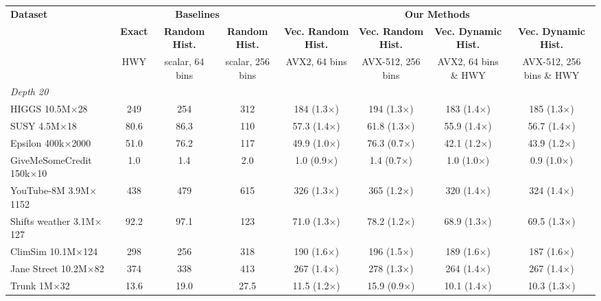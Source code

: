 \begin{table}[p]
    \centering
    \ContinuedFloat
    \footnotesize
    \setlength{\tabcolsep}{2.5pt}
    \begin{tabular}{l|ccc|cccc}
        \hline
        \multirow{3}{*}{\textbf{Dataset}} & \multicolumn{3}{c|}{\textbf{Baselines}} & \multicolumn{4}{c}{\textbf{Our Methods}} \\
         & \textbf{Exact} & \textbf{Random Hist.} & \textbf{Random Hist.} & \textbf{Vec. Random Hist.} & \textbf{Vec. Random Hist.} & \textbf{Vec. Dynamic Hist.} & \textbf{Vec. Dynamic Hist.} \\
         & \scriptsize HWY & \scriptsize scalar, 64 bins & \scriptsize scalar, 256 bins & \scriptsize AVX2, 64 bins & \scriptsize AVX-512, 256 bins & \scriptsize AVX2, 64 bins \& HWY & \scriptsize AVX-512, 256 bins \& HWY \\
        \hline
        \multicolumn{8}{l}{\textit{Depth 20}} \\
        HIGGS 10.5M$\times$28 & 249 & 254 & 312 & 184 (1.3$\times$) & 194 (1.3$\times$) & 183 (1.4$\times$) & 185 (1.3$\times$) \\
        SUSY 4.5M$\times$18 & 80.6 & 86.3 & 110 & 57.3 (1.4$\times$) & 61.8 (1.3$\times$) & 55.9 (1.4$\times$) & 56.7 (1.4$\times$) \\
        Epsilon 400k$\times$2000 & 51.0 & 76.2 & 117 & 49.9 (1.0$\times$) & 76.3 (0.7$\times$) & 42.1 (1.2$\times$) & 43.9 (1.2$\times$) \\
        GiveMeSomeCredit 150k$\times$10 & 1.0 & 1.4 & 2.0 & 1.0 (0.9$\times$) & 1.4 (0.7$\times$) & 1.0 (1.0$\times$) & 0.9 (1.0$\times$) \\
        YouTube-8M 3.9M$\times$1152 & 438 & 479 & 615 & 326 (1.3$\times$) & 365 (1.2$\times$) & 320 (1.4$\times$) & 324 (1.4$\times$) \\
        Shifts weather 3.1M$\times$127 & 92.2 & 97.1 & 123 & 71.0 (1.3$\times$) & 78.2 (1.2$\times$) & 68.9 (1.3$\times$) & 69.5 (1.3$\times$) \\
        ClimSim 10.1M$\times$124 & 298 & 256 & 318 & 190 (1.6$\times$) & 196 (1.5$\times$) & 189 (1.6$\times$) & 187 (1.6$\times$) \\
        Jane Street 10.2M$\times$82 & 374 & 338 & 413 & 267 (1.4$\times$) & 278 (1.3$\times$) & 264 (1.4$\times$) & 267 (1.4$\times$) \\
        Trunk 1M$\times$32 & 13.6 & 19.0 & 27.5 & 11.5 (1.2$\times$) & 15.9 (0.9$\times$) & 10.1 (1.4$\times$) & 10.3 (1.3$\times$) \\

\end{tabular}
\end{table}
